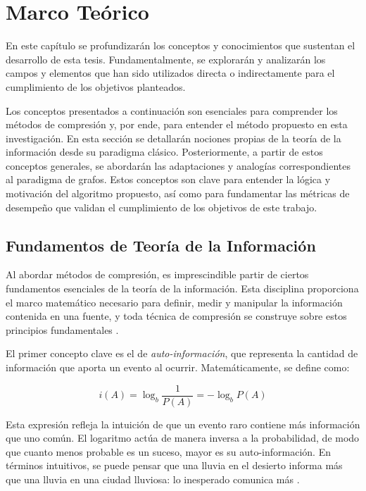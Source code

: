 \chapter{Marco Teórico}

En este capítulo se profundizarán los conceptos y conocimientos que sustentan el desarrollo de esta tesis. Fundamentalmente, se explorarán y analizarán los campos y elementos que han sido utilizados directa o indirectamente para el cumplimiento de los objetivos planteados.

Los conceptos presentados a continuación son esenciales para comprender los métodos de compresión y, por ende, para entender el método propuesto en esta investigación. En esta sección se detallarán nociones propias de la teoría de la información desde su paradigma clásico. Posteriormente, a partir de estos conceptos generales, se abordarán las adaptaciones y analogías correspondientes al paradigma de grafos. Estos conceptos son clave para entender la lógica y motivación del algoritmo propuesto, así como para fundamentar las métricas de desempeño que validan el cumplimiento de los objetivos de este trabajo.

\section{Fundamentos de Teoría de la Información}

Al abordar métodos de compresión, es imprescindible partir de ciertos fundamentos esenciales de la teoría de la información. Esta disciplina proporciona el marco matemático necesario para definir, medir y manipular la información contenida en una fuente, y toda técnica de compresión se construye sobre estos principios fundamentales \cite{mackay_nodate, sayood2006introduction}.

El primer concepto clave es el de \textit{auto-información}, que representa la cantidad de información que aporta un evento al ocurrir. Matemáticamente, se define como:

\begin{equation}
i(A) = \log_b \frac{1}{P(A)} = -\log_b P(A)
\end{equation}

Esta expresión refleja la intuición de que un evento raro contiene más información que uno común. El logaritmo actúa de manera inversa a la probabilidad, de modo que cuanto menos probable es un suceso, mayor es su auto-información. En términos intuitivos, se puede pensar que una lluvia en el desierto informa más que una lluvia en una ciudad lluviosa: lo inesperado comunica más \cite{mackay_nodate}.

